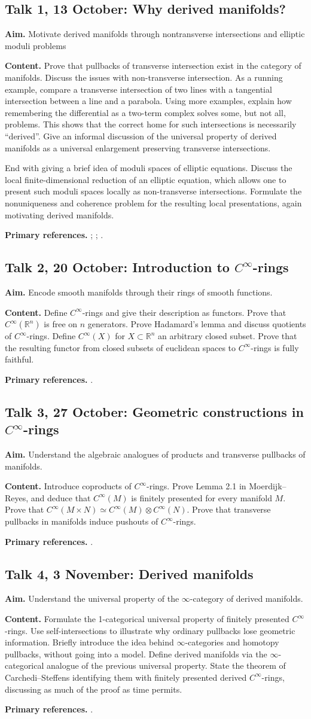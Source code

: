 \documentclass[11pt,a4paper]{article}
\newcommand{\Cinfty}{\ensuremath{C^\infty}}
\newcommand{\Talk}[6]{%
  \subsection*{Talk #1, #2: #3}
  \textbf{Aim.} #4

  \textbf{Content.} #5

  \textbf{Primary references.} #6
  \par\medskip
}
\begin{document}
\Talk{1}{13 October}{Why derived manifolds?}
{Motivate derived manifolds through nontransverse intersections and elliptic moduli problems}
{Prove that pullbacks of transverse intersection exist in the category of manifolds. Discuss the issues with non-transverse intersection. As a running example, compare a transverse intersection of two lines with a tangential intersection between a line and a parabola. Using more examples, explain how remembering the differential as a two-term complex solves some, but not all, problems. This shows that the correct home for such intersections is necessarily ``derived''. Give an informal discussion of the universal property of derived manifolds as a universal enlargement preserving transverse intersections.
	
End with giving a brief idea of moduli spaces of elliptic equations. Discuss the local finite-dimensional reduction of an
elliptic equation, which allows one to present such moduli spaces locally as non-transverse intersections. Formulate the nonuniqueness and coherence problem for the resulting local presentations, again motivating derived manifolds.}
{\textcite[Section~1]{Spivak_Derived_Smooth_Manifolds};
\textcite[Chapter~1, especially Section~1.0.1]{Steffens_Derived_Differential_Geometry};
\textcite[Sections~1--2]{Pardon_Representability_Elliptic_Fredholm}.}

\Talk{2}{20 October}{Introduction to \Cinfty-rings}
{Encode smooth manifolds through their rings of smooth functions.}
{Define \Cinfty-rings and give their description as functors. Prove that $\Cinfty(\mathbb R^n)$ is free on
$n$ generators. Prove Hadamard's lemma and discuss quotients of \Cinfty-rings. Define $\Cinfty(X)$ for $X\subset \mathbb R^n$ an arbitrary closed subset. Prove that the resulting functor from closed subsets of euclidean spaces to $\Cinfty$-rings is fully faithful.}
{\textcite[Chapter~I, Section~1]{Moerdijk_Reyes_Smooth_Infinitesimal_Analysis}.}

\Talk{3}{27 October}{Geometric constructions in \Cinfty-rings}
{Understand the algebraic analogues of products and transverse pullbacks of manifolds.}
{Introduce coproducts of $\Cinfty$-rings. Prove Lemma 2.1 in Moerdijk--Reyes, and deduce that $\Cinfty(M)$ is finitely presented for every manifold $M$. Prove that $\Cinfty(M\times N) \simeq \Cinfty(M) \otimes \Cinfty(N)$. Prove that transverse pullbacks in manifolds induce pushouts of $\Cinfty$-rings.}
{\textcite[Chapter~I, Section~2]{Moerdijk_Reyes_Smooth_Infinitesimal_Analysis}.}

\Talk{4}{3 November}{Derived manifolds}
{Understand the universal property of the $\infty$-category of derived manifolds.}
{Formulate the 1-categorical universal property of finitely presented $\Cinfty$-rings. Use self-intersections to illustrate why ordinary pullbacks lose geometric information. Briefly introduce the idea behind $\infty$-categories and homotopy pullbacks, without going into a model. Define derived manifolds via the $\infty$-categorical analogue of the previous universal property. State the theorem of Carchedi--Steffens identifying them with finitely presented derived $\Cinfty$-rings, discussing as much of the proof as time permits.}
{\textcite{Carchedi_Steffens_Universal_Derived_Manifolds}.}
\end{document}
